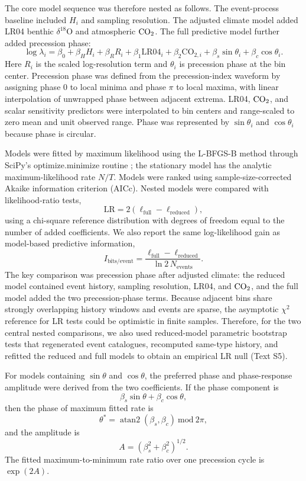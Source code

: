 \documentclass[11pt]{article}
\begin{document}
The core model sequence was therefore nested as follows. The event-process baseline included \(H_i\) and sampling resolution. The adjusted climate model added LR04 benthic \(\delta^{18}\mathrm{O}\) and atmospheric \(\ce{CO2}\). The full predictive model further added precession phase:
\[
\log \lambda_i
= \beta_0
+\beta_H H_i
+\beta_R R_i
+\beta_1 \mathrm{LR04}_i
+\beta_2 \mathrm{CO}_{2,i}
+\beta_s \sin\theta_i
+\beta_c \cos\theta_i .
\]
Here \(R_i\) is the scaled log-resolution term and \(\theta_i\) is precession phase at the bin center. Precession phase was defined from the precession-index waveform \citep{laskar2004long} by assigning phase \(0\) to local minima and phase \(\pi\) to local maxima, with linear interpolation of unwrapped phase between adjacent extrema. LR04, \(\ce{CO2}\), and scalar sensitivity predictors were interpolated to bin centers and range-scaled to zero mean and unit observed range. Phase was represented by \(\sin\theta_i\) and \(\cos\theta_i\) because phase is circular.

Models were fitted by maximum likelihood using the L-BFGS-B method through SciPy's optimize.minimize routine \citep{virtanen2020scipy}; the stationary model has the analytic maximum-likelihood rate \(N/T\). Models were ranked using sample-size-corrected Akaike information criterion (AICc). Nested models were compared with likelihood-ratio tests,
\[
\mathrm{LR}=2(\ell_\mathrm{full}-\ell_\mathrm{reduced}),
\]
using a chi-square reference distribution with degrees of freedom equal to the number of added coefficients. We also report the same log-likelihood gain as model-based predictive information,
\[
I_{\mathrm{bits/event}}
=
\frac{\ell_\mathrm{full}-\ell_\mathrm{reduced}}
{\ln 2\,N_{\mathrm{events}}}.
\]
The key comparison was precession phase after adjusted climate: the reduced model contained event history, sampling resolution, LR04, and \(\ce{CO2}\), and the full model added the two precession-phase terms. Because adjacent bins share strongly overlapping history windows and events are sparse, the asymptotic \(\chi^2\) reference for LR tests could be optimistic in finite samples. Therefore, for the two central nested comparisons, we also used reduced-model parametric bootstrap tests that regenerated event catalogues, recomputed same-type history, and refitted the reduced and full models to obtain an empirical LR null (Text S5).

For models containing \(\sin\theta\) and \(\cos\theta\), the preferred phase and phase-response amplitude were derived from the two coefficients. If the phase component is
\[
\beta_s\sin\theta+\beta_c\cos\theta,
\]
then the phase of maximum fitted rate is
\[
\theta^\ast=\operatorname{atan2}(\beta_s,\beta_c)\ \mathrm{mod}\ 2\pi,
\]
and the amplitude is
\[
A=(\beta_s^2+\beta_c^2)^{1/2}.
\]
The fitted maximum-to-minimum rate ratio over one precession cycle is \(\exp(2A)\).
\end{document}
